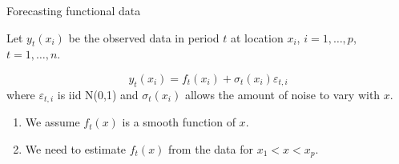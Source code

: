 \documentclass[14pt,xcolor=dvipsnames]{beamer}
\begin{document}
\begin{frame}{Forecasting functional data}

Let $y_t(x_i)$ be the observed data in period $t$ at location $x_i$, $i=1,\dots,p$, $t=1,\dots,n$.
\pause

\begin{block}{}
$$y_t(x_i) = f_t(x_i) + \sigma_t(x_i)\varepsilon_{t,i}$$
where $\varepsilon_{t,i}$ is iid N(0,1) and $\sigma_t(x_i)$ allows the amount of noise to vary with $x$.
\end{block}
\pause

\begin{enumerate}[<+-| alert@+>]
\item We assume $f_t(x)$ is a smooth function of $x$.
\item We need to estimate $f_t(x)$ from the data for $x_1 < x < x_p$.
\end{enumerate}
\end{frame}
\end{document}

